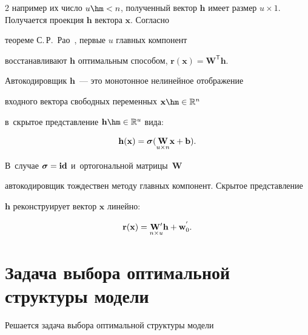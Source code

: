 \begin{multicols}{2}
например их число $u \hm< n$,  полученный вектор $\mathbf{h}$ имеет размер $u 


\times 1$. Получается проекция $\mathbf{h}$ вектора $\mathbf{x}$. Согласно 


теореме С.\,Р.~Рао~\cite{fourth}, первые $u$ главных компонент 


восстанавливают $\mathbf{h}$ оптимальным способом, $\mathbf{r}(\mathbf{x}) = 


\mathbf{W}^{\mathsf{T}}\mathbf{h}.$





Автокодировщик $\mathbf{h}$~--- это монотонное нелинейное отображение 


входного вектора свободных переменных $\mathbf{x} \hm\in \mathbb{R}^n$ 


в~скрытое представление $\mathbf{h} \hm\in \mathbb{R}^{u}$ вида:


\begin{equation*}




\mathbf{h}(\x) = \sigmab(\underset{u \times n}{\mathbf{W}}\x + \mathbf{b}) .


\end{equation*}


В~случае ${\boldsymbol{\sigma}} = \mathbf{id}$ и~ортогональной матрицы~$\mathbf{W}$




автокодировщик тождествен методу главных компонент. Скрытое представление 


$\mathbf{h}$ реконструирует вектор $\mathbf{x}$ линейно:


\begin{equation*}




\mathbf{r}(\x) = \underset{n \times u}{\mathbf{W}{'}}\mathbf{h} + 


\wm_{0}^{'}.


\end{equation*}





\section{Задача выбора оптимальной структуры модели}





Решается задача выбора оптимальной структуры модели



\end{multicols}
